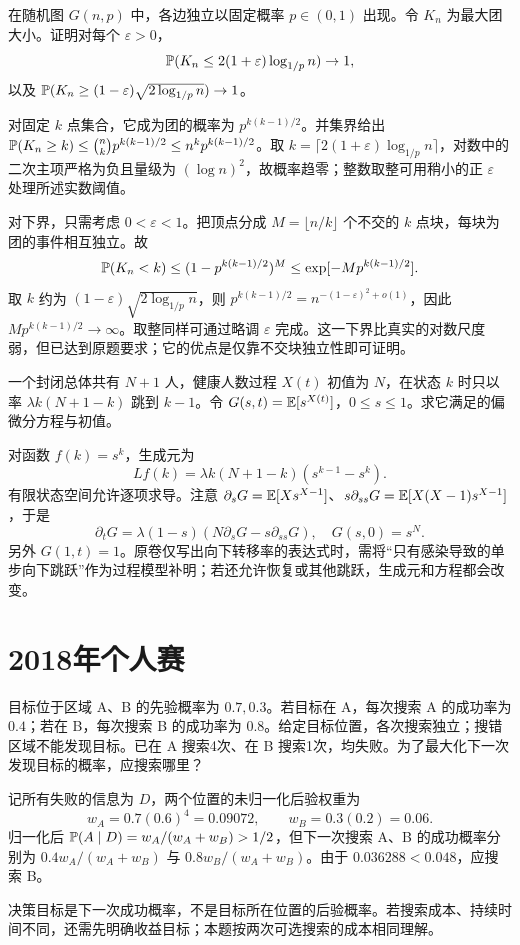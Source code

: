 \begin{example}[原题4：随机图最大团的粗上下界]\label{yau:2017-4}
在随机图 $G(n,p)$ 中，各边独立以固定概率 $p\in(0,1)$ 出现。令 $K_n$ 为最大团大小。证明对每个 $\varepsilon>0$，
\[
\mathbb P(K_n\le2(1+\varepsilon)\log_{1/p}n)\to1,
\]
以及 $\mathbb P(K_n\ge(1-\varepsilon)\sqrt{2\log_{1/p}n})\to1$。
\end{example}
\begin{solve}
对固定 $k$ 点集合，它成为团的概率为 $p^{k(k-1)/2}$。并集界给出 $\mathbb P(K_n\ge k)\le\binom nk p^{k(k-1)/2}\le n^kp^{k(k-1)/2}$。取 $k=\lceil2(1+\varepsilon)\log_{1/p}n\rceil$，对数中的二次主项严格为负且量级为 $(\log n)^2$，故概率趋零；整数取整可用稍小的正 $\varepsilon$ 处理所述实数阈值。

对下界，只需考虑 $0<\varepsilon<1$。把顶点分成 $M=\lfloor n/k\rfloor$ 个不交的 $k$ 点块，每块为团的事件相互独立。故
\[
\mathbb P(K_n<k)\le(1-p^{k(k-1)/2})^M\le\exp[-Mp^{k(k-1)/2}].
\]
取 $k$ 约为 $(1-\varepsilon)\sqrt{2\log_{1/p}n}$，则 $p^{k(k-1)/2}=n^{-(1-\varepsilon)^2+o(1)}$，因此 $Mp^{k(k-1)/2}\to\infty$。取整同样可通过略调 $\varepsilon$ 完成。这一下界比真实的对数尺度弱，但已达到原题要求；它的优点是仅靠不交块独立性即可证明。
\end{solve}

\begin{example}[原题5：纯死亡过程的概率生成函数]\label{yau:2017-5}
一个封闭总体共有 $N+1$ 人，健康人数过程 $X(t)$ 初值为 $N$，在状态 $k$ 时只以率 $\lambda k(N+1-k)$ 跳到 $k-1$。令 $G(s,t)=\mathbb E[s^{X(t)}]$，$0\le s\le1$。求它满足的偏微分方程与初值。
\end{example}
\begin{solve}
对函数 $f(k)=s^k$，生成元为
\[
Lf(k)=\lambda k(N+1-k)(s^{k-1}-s^k).
\]
有限状态空间允许逐项求导。注意 $\partial_sG=\mathbb E[Xs^{X-1}]$、$s\partial_{ss}G=\mathbb E[X(X-1)s^{X-1}]$，于是
\[
\partial_tG=\lambda(1-s)\left(N\partial_sG-s\partial_{ss}G\right),\quad G(s,0)=s^N.
\]
另外 $G(1,t)=1$。原卷仅写出向下转移率的表达式时，需将“只有感染导致的单步向下跳跃”作为过程模型补明；若还允许恢复或其他跳跃，生成元和方程都会改变。
\end{solve}

\section{2018年个人赛}
\begin{example}[原题1：搜索失败后的最优下一步]\label{yau:2018-1}
目标位于区域 A、B 的先验概率为 $0.7,0.3$。若目标在 A，每次搜索 A 的成功率为 $0.4$；若在 B，每次搜索 B 的成功率为 $0.8$。给定目标位置，各次搜索独立；搜错区域不能发现目标。已在 A 搜索4次、在 B 搜索1次，均失败。为了最大化下一次发现目标的概率，应搜索哪里？
\end{example}
\begin{solve}
记所有失败的信息为 $D$，两个位置的未归一化后验权重为
\[
w_A=0.7(0.6)^4=0.09072,\qquad w_B=0.3(0.2)=0.06.
\]
归一化后 $\mathbb P(A\mid D)=w_A/(w_A+w_B)>1/2$，但下一次搜索 A、B 的成功概率分别为 $0.4w_A/(w_A+w_B)$ 与 $0.8w_B/(w_A+w_B)$。由于 $0.036288<0.048$，应搜索 B。

决策目标是下一次成功概率，不是目标所在位置的后验概率。若搜索成本、持续时间不同，还需先明确收益目标；本题按两次可选搜索的成本相同理解。
\end{solve}

